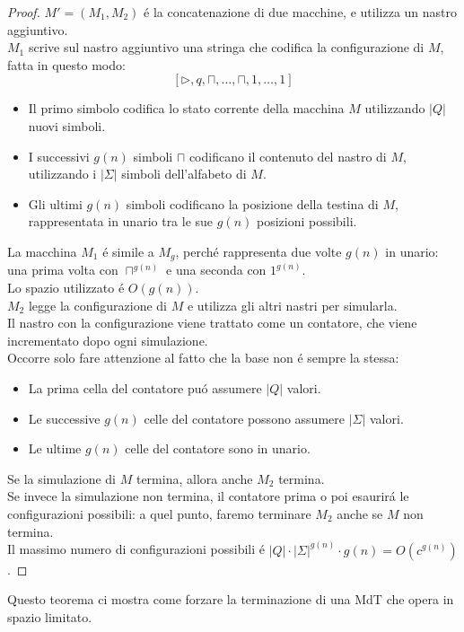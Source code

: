 \begin{proof}
$M' = (M_1, M_2)$ é la concatenazione di due macchine, e utilizza un nastro aggiuntivo. \\
$M_1$ scrive sul nastro aggiuntivo una stringa che codifica la configurazione di $M$, fatta in questo modo: \\
\[[\triangleright, q, \sqcap, \dots, \sqcap, 1, \dots, 1]\]
\begin{itemize}
	\item Il primo simbolo codifica lo stato corrente della macchina $M$ utilizzando $|Q|$ nuovi simboli.
	\item I successivi $g(n)$ simboli $\sqcap$ codificano il contenuto del nastro di $M$, utilizzando i $|\Sigma|$ simboli dell'alfabeto di $M$.
	\item Gli ultimi $g(n)$ simboli codificano la posizione della testina di $M$, rappresentata in unario tra le sue $g(n)$ posizioni possibili.
\end{itemize}
La macchina $M_1$ é simile a $M_g$, perché rappresenta due volte $g(n)$ in unario: una prima volta con $\sqcap^{g(n)}$ e una seconda con $1^{g(n)}$. \\
Lo spazio utilizzato é $O(g(n))$. \\

$M_2$ legge la configurazione di $M$ e utilizza gli altri nastri per simularla. \\
Il nastro con la configurazione viene trattato come un contatore, che viene incrementato dopo ogni simulazione. \\
Occorre solo fare attenzione al fatto che la base non é sempre la stessa:
\begin{itemize}
	\item La prima cella del contatore puó assumere $|Q|$ valori.
	\item Le successive $g(n)$ celle del contatore possono assumere $|\Sigma|$ valori.
	\item Le ultime $g(n)$ celle del contatore sono in unario.
\end{itemize}
Se la simulazione di $M$ termina, allora anche $M_2$ termina. \\
Se invece la simulazione non termina, il contatore prima o poi esaurirá le configurazioni possibili: a quel punto, faremo terminare $M_2$ anche se $M$ non termina. \\
Il massimo numero di configurazioni possibili é $|Q| \cdot |\Sigma|^{g(n)} \cdot {g(n)} = O(c^{g(n)})$.
\end{proof}
Questo teorema ci mostra come forzare la terminazione di una MdT che opera in spazio limitato.
